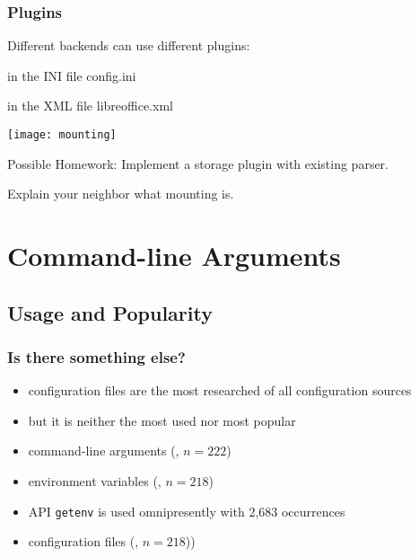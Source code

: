 \begin{frame}
	\frametitle{Plugins}

	Different backends can use different plugins:
	\begin{description}[labelsep=10cm,align=right]
	\item[\texttt{/sw}] in the INI file config.ini
	\item[\texttt{/sw/libreoffice}] in the XML file libreoffice.xml
	\end{description}

	\texttt{[image: mounting]}
\end{frame}

\begin{assignment}
	\begin{task}
	Possible Homework: Implement a storage plugin with existing parser.
	\end{task}

	\begin{task}
	Explain your neighbor what mounting is.
	\end{task}
\end{assignment}


\section{Command-line Arguments}

\subsection{Usage and Popularity}

\begin{frame}
	\frametitle{Is there something else?}
	\begin{itemize}
	\item configuration files are the most researched of all configuration sources~\cite{jin2014configurations}
	\item but it is neither the most used nor most popular~\cite{raab2017challenges}
	\end{itemize}
\end{frame}

\begin{frame}
	\methodQuestion{} 
	\begin{itemize}
	\item command-line arguments (, $n=222$)
	\item environment variables (, $n=218$)
	\item \methodSource{} API \texttt{getenv} is used omnipresently with 2,683 occurrences
	\item configuration files (, $n=218$))
	\end{itemize}
\end{frame}


